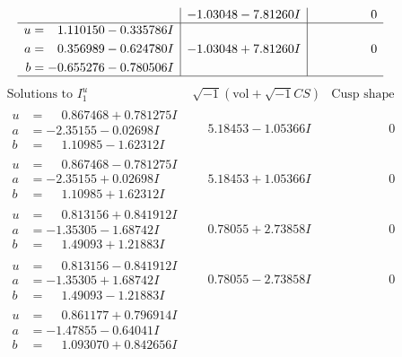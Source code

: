 \documentclass[1p]{elsarticle_modified}
\theoremstyle{definition}
\newcommand{\I}{\sqrt{-1}}
\begin{document}
$$\begin{array}{c|c|c}
 & -1.03048 - 7.81260 I & \phantom{-0.000000 } 0 \\ \hline\begin{aligned}
u &= \phantom{-}1.110150 - 0.335786 I \\
a &= \phantom{-}0.356989 - 0.624780 I \\
b &= -0.655276 - 0.780506 I\end{aligned}
 & -1.03048 + 7.81260 I & \phantom{-0.000000 } 0\\
 \hline 
 \end{array}$$\newpage$$\begin{array}{c|c|c}  
\text{Solutions to }I^u_{1}& \I (\text{vol} + \sqrt{-1}CS) & \text{Cusp shape}\\
 \hline 
\begin{aligned}
u &= \phantom{-}0.867468 + 0.781275 I \\
a &= -2.35155 - 0.02698 I \\
b &= \phantom{-}1.10985 - 1.62312 I\end{aligned}
 & \phantom{-}5.18453 - 1.05366 I & \phantom{-0.000000 } 0 \\ \hline\begin{aligned}
u &= \phantom{-}0.867468 - 0.781275 I \\
a &= -2.35155 + 0.02698 I \\
b &= \phantom{-}1.10985 + 1.62312 I\end{aligned}
 & \phantom{-}5.18453 + 1.05366 I & \phantom{-0.000000 } 0 \\ \hline\begin{aligned}
u &= \phantom{-}0.813156 + 0.841912 I \\
a &= -1.35305 - 1.68742 I \\
b &= \phantom{-}1.49093 + 1.21883 I\end{aligned}
 & \phantom{-}0.78055 + 2.73858 I & \phantom{-0.000000 } 0 \\ \hline\begin{aligned}
u &= \phantom{-}0.813156 - 0.841912 I \\
a &= -1.35305 + 1.68742 I \\
b &= \phantom{-}1.49093 - 1.21883 I\end{aligned}
 & \phantom{-}0.78055 - 2.73858 I & \phantom{-0.000000 } 0 \\ \hline\begin{aligned}
u &= \phantom{-}0.861177 + 0.796914 I \\
a &= -1.47855 - 0.64041 I \\
b &= \phantom{-}1.093070 + 0.842656 I\end{aligned}

\end{array}$$
\end{document}
